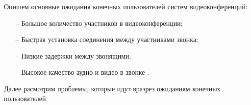 
Опишем основные ожидания конечных пользователей систем видеоконференций:
\begin{itemize}
	\item[--] Большое количество участников в видеоконференции;
	\item[--] Быстрая установка соединения между участниками звонка;
	\item[--] Низкие задержки между звонящими;
        \item[--] Высокое качество аудио и видео в звонке \cite{v4}.
\end{itemize}

Далее расмотрим проблемы, которые идут вразрез ожиданиям конечных пользователей.

\pagebreak